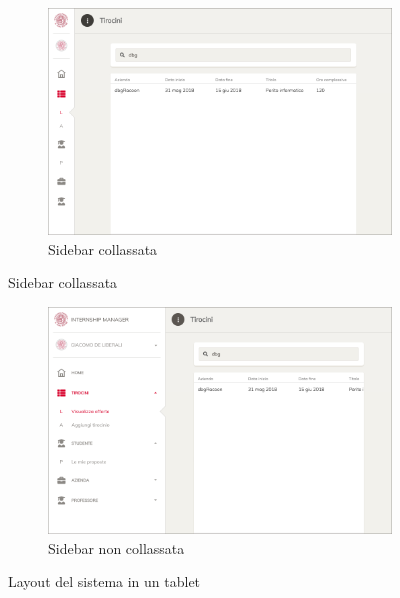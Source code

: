 \begin{figure}[h]
	\centering
	\begin{subfigure}[b]{0.5\textwidth}
		\includegraphics[width=\textwidth]{Chapter2/Figs/md-closed}     
		\caption{Sidebar collassata}
		\label{fig:screenshot:11}
	\end{subfigure}        
\end{figure}

\begin{figure}[h]\ContinuedFloat
	\centering
	\begin{subfigure}[b]{0.8\textwidth}
		\includegraphics[width=\textwidth]{Chapter2/Figs/md-open}     
		\caption{Sidebar non collassata}
		\label{fig:screenshot:12}
	\end{subfigure}  
	\caption[Screenshot: layout del sistema in un tablet]{Layout del sistema in un tablet}
	\label{fig:screenshot:11-12}
\end{figure}

